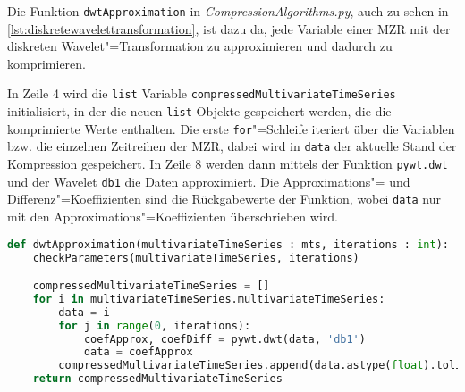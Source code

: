 Die Funktion \lstinline|dwtApproximation| in \textit{CompressionAlgorithms.py}, auch zu sehen in \autoref{lst:diskretewavelettransformation}, ist dazu da, jede Variable einer \ac{MZR} mit der diskreten Wavelet"=Transformation zu approximieren und dadurch zu komprimieren.

In Zeile 4 wird die \lstinline|list| Variable \lstinline|compressedMultivariateTimeSeries| initialisiert, in der die neuen \lstinline|list| Objekte gespeichert werden, die die komprimierte Werte enthalten. Die erste \lstinline|for|"=Schleife iteriert über die Variablen bzw. die einzelnen Zeitreihen der \ac{MZR}, dabei wird in \lstinline|data| der aktuelle Stand der Kompression gespeichert. In Zeile 8 werden dann mittels der Funktion \lstinline|pywt.dwt| und der Wavelet \lstinline|db1| die Daten approximiert. Die Approximations"= und Differenz"=Koeffizienten sind die Rückgabewerte der Funktion, wobei \lstinline|data| nur mit den Approximations"=Koeffizienten überschrieben wird. 
\begin{lstlisting}[caption=Stückweise polynomielle Approximation, label=lst:diskretewavelettransformation, style=Python, language=Python]
def dwtApproximation(multivariateTimeSeries : mts, iterations : int):
    checkParameters(multivariateTimeSeries, iterations)

    compressedMultivariateTimeSeries = []
    for i in multivariateTimeSeries.multivariateTimeSeries:
        data = i
        for j in range(0, iterations):
            coefApprox, coefDiff = pywt.dwt(data, 'db1')
            data = coefApprox
        compressedMultivariateTimeSeries.append(data.astype(float).tolist())
    return compressedMultivariateTimeSeries
\end{lstlisting}
